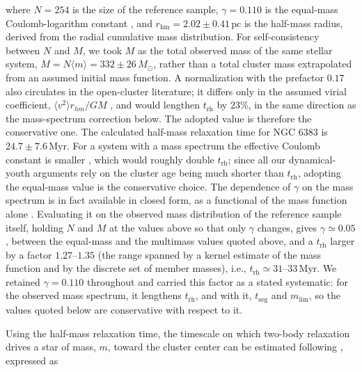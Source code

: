 \documentclass{aa}
\begin{document}
where $N=254$ is the size of the reference sample, $\gamma = 0.110$ is the equal-mass Coulomb-logarithm constant \citep[not to be confused with the HDBSCAN density level $\lambda$ of Sect.~\ref{subsubsec:membership};][]{1994MNRAS.268..257G}, and $r_\mathrm{hm} = 2.02 \pm 0.41\,\mathrm{pc}$ is the half-mass radius, derived from the radial cumulative mass distribution. For self-consistency between $N$ and $M$, we took $M$ as the total observed mass of the same stellar system, $M = N\langle m \rangle = 332 \pm 26\,M_\odot$, rather than a total cluster mass extrapolated from an assumed initial mass function. A normalization with the prefactor $0.17$ also circulates in the open-cluster literature; it differs only in the assumed virial coefficient, $\langle v^2\rangle r_{hm}/GM$ \citep[the value $0.4$ adopted here follows][]{1971ApJ...164..399S}, and would lengthen $t_{\mathrm{rh}}$ by $23\%$, in the same direction as the mass-spectrum correction below. The adopted value is therefore the conservative one. The calculated half-mass relaxation time for NGC 6383 is $24.7\pm 7.6\,\mathrm{Myr}$. For a system with a mass spectrum the effective Coulomb constant is smaller \citep[$\gamma\simeq0.02$;][]{1996MNRAS.279.1037G}, which would roughly double $t_{\mathrm{rh}}$; since all our dynamical-youth arguments rely on the cluster age being much shorter than $t_{\mathrm{rh}}$, adopting the equal-mass value is the conservative choice. The dependence of $\gamma$ on the mass spectrum is in fact available in closed form, as a functional of the mass function alone \citep[Eqs.~11 and 26]{1975IAUS...69..133H}. Evaluating it on the observed mass distribution of the reference sample itself, holding $N$ and $M$ at the values above so that only $\gamma$ changes, gives $\gamma\simeq0.05$, between the equal-mass and the multimass values quoted above, and a $t_{\mathrm{rh}}$ larger by a factor $1.27$--$1.35$ (the range spanned by a kernel estimate of the mass function and by the discrete set of member masses), i.e., $t_{\mathrm{rh}}\simeq31$--$33\,\mathrm{Myr}$. We retained $\gamma=0.110$ throughout and carried this factor as a stated systematic: for the observed mass spectrum, it lengthens $t_{\mathrm{rh}}$, and with it, $t_{\mathrm{seg}}$ and $m_{\mathrm{lim}}$, so the values quoted below are conservative with respect to it.

Using the half-mass relaxation time, the timescale on which two-body relaxation drives a star of mass, $m$, toward the cluster center can be estimated following \citet{1969ApJ...158L.139S}, expressed as
\end{document}
